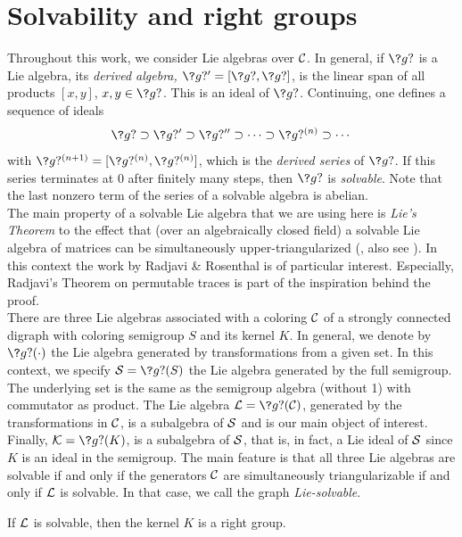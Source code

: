 %


\section{Solvability and right groups}
\label{sec:solv}
Throughout this work, we consider Lie algebras over $\mathcal{C}$. In general, if $\?g?$ is a Lie 
algebra, its {\sl derived algebra,} $\?g?'=[\?g?,\?g?]$, 
is the linear span of all products $[x,y]$, $x,y\in\?g?$. 
This is an ideal of $\?g?$. Continuing, one defines a 
sequence of ideals 
$$\?g?\supset\?g?' \supset \?g?'' \supset \cdots \supset \?g?^{(n)} \supset \cdots$$ with
$\?g?^{(n+1)}=[\?g?^{(n)},\?g?^{(n)}]$,
which is the {\sl derived series\/} of $\?g?$. 
If this series terminates at $0$ after finitely many steps, then $\?g?$ is {\sl solvable}. 
Note that the last nonzero term of the series  of a solvable algebra is abelian.\\

The main property of a solvable Lie algebra
that we are using here is {\em Lie's Theorem\/} to the effect that (over an algebraically closed field)
a solvable Lie algebra of matrices can be simultaneously upper-triangularized 
(\cite[p.]{JA}, also see \cite[p.--26]{RR}).
In this context the work by Radjavi \& Rosenthal \cite{RR} is of particular interest. Especially,
Radjavi's Theorem on permutable traces \cite[p.]{RR} 
is part of the inspiration behind the proof.\\

There are three Lie algebras associated with a coloring ${\mathcal C}$ of 
a strongly connected digraph with coloring semigroup $S$ and its kernel $K$.
In general, we denote by $\?g?(\cdot)$ the Lie algebra generated by 
transformations from a given set. In this context, we specify
$\cS=\?g?(S)$ the Lie algebra generated by the full semigroup. The underlying set is the 
same as the semigroup algebra (without 1) with commutator as product. The Lie algebra
$\L=\?g?(\Co)$, generated by the transformations in ${\mathcal C}$, is a subalgebra of ${\mathcal S}$ and is our main
object of interest. Finally, $\cK=\?g?(K)$, is a subalgebra of ${\mathcal S}$, that is, in fact, a Lie ideal of ${\mathcal S}$
since $K$ is an ideal in the semigroup. 
The main feature is that all three Lie algebras are solvable
if and only if the generators ${\mathcal C}$ are simultaneously triangularizable if and only if ${\mathcal L}$ is
solvable. In that case, we call the graph {\it Lie-solvable\/}.\\

\begin{theorem} \label{thm:RG} \label{thm:4.14} 
If ${\mathcal L}$ is solvable, then the kernel $K$ is a right group.
\end{theorem}

